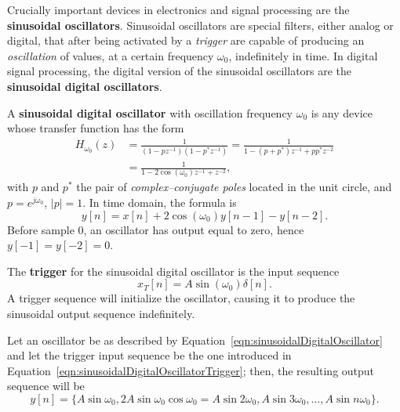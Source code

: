 \documentclass[\documentfontsize, twocolumn]{\classname}
\begin{document}
Crucially important devices in electronics and signal processing are the \textbf{sinusoidal oscillators}. Sinusoidal oscillators are special filters, either analog or digital, that after being activated by a \emph{trigger} are capable of producing an \emph{oscillation} of values, at a certain frequency $\omega_0$, indefinitely in time. In digital signal processing, the digital version of the sinusoidal oscillators are the \textbf{sinusoidal digital oscillators}.

\begin{defin}
    A \textbf{sinusoidal digital oscillator} with oscillation frequency $\omega_0$ is any device whose transfer function has the form
    \begin{eqnarray}\label{eqn:sinusoidalDigitalOscillator}
        H_{\omega_0}(z) &= \frac{
            1
        } {
            (1 - pz^{-1})(1 - p^*z^{-1})
        } = \frac {
            1
        } {
            1 - (p + p^*)z^{-1} + pp^*z^{-2}
        }\\ &= \frac {
            1
        } {
            1 - 2\cos{(\omega_0)} z^{-1} + z^{-2}
        },
    \end{eqnarray}
    with $p$ and $p^*$ the pair of \emph{complex--conjugate poles} located in the unit circle, and $p = e^{j\omega_0}$, $|p| = 1$. In time domain, the formula is
    \begin{equation}\label{eqn:sinusoidalDigitalOscillatorTime}
        y[n] = x[n] + 2\cos{(\omega_0)}y[n-1] - y[n-2].
    \end{equation}
    Before sample $0$, an oscillator has output equal to zero, hence $y[-1]=y[-2]=0$.

    The \textbf{trigger} for the sinusoidal digital oscillator is the input sequence
\begin{equation}\label{eqn:sinusoidalDigitalOscillatorTrigger}
    x_T[n] = A\sin{(\omega_0)}\delta[n].
\end{equation}
    A trigger sequence will initialize the oscillator, causing it to produce the sinusoidal output sequence indefinitely.
\end{defin}

Let an oscillator be as described by Equation~\ref{eqn:sinusoidalDigitalOscillator} and let the trigger input sequence be the one introduced in Equation~\ref{eqn:sinusoidalDigitalOscillatorTrigger}; then, the resulting output sequence will be
\[
    y[n] = \{A\sin\omega_0, 2A\sin\omega_0\cos\omega_0 = A\sin{2\omega_0}, A\sin{3\omega_0}, \dots, A\sin{n\omega_0}\}.
\]
\end{document}
